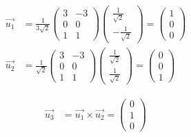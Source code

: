 \begin{align}
    \Vec{u_1} &= \frac{1}{3\sqrt{2}} \begin{pmatrix}
        3 & -3 \\ 0 & 0 \\ 1 & 1
    \end{pmatrix} \begin{pmatrix}
        \frac{1}{\sqrt{2}} \\ -\frac{1}{\sqrt{2}}
    \end{pmatrix} = \begin{pmatrix}
        1 \\ 0 \\ 0
    \end{pmatrix} \\ 
    \Vec{u_2} &= \frac{1}{\sqrt{2}} \begin{pmatrix}
        3 & -3 \\ 0 & 0 \\ 1 & 1
    \end{pmatrix} \begin{pmatrix}
        \frac{1}{\sqrt{2}} \\ \frac{1}{\sqrt{2}}
    \end{pmatrix} = \begin{pmatrix}
        0 \\ 0 \\ 1
    \end{pmatrix}
\end{align}

\begin{align}
    \Vec{u_3} &= \Vec{u_1} \times \Vec{u_2} = \begin{pmatrix}
        0 \\ 1 \\ 0
    \end{pmatrix}
\end{align}

